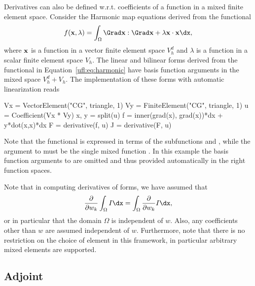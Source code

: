 Derivatives can also be defined w.r.t. coefficients of a function in a
mixed finite element space.  Consider the Harmonic map equations
derived from the functional
\begin{align} \label{ufl:eq:harmonic}
f(\xx, \lambda) = \int_\Omega \Grad \xx : \Grad \xx + \lambda \xx\cdot\xx \dx,
\end{align}
where $\mathbf{x}$ is a function in a vector finite element space $V_h^d$ and
$\lambda$ is a function in a scalar finite element space $V_h$.  The
linear and bilinear forms derived from the functional in
Equation~\ref{ufl:eq:harmonic} have basis function arguments in the
mixed space $V_h^d + V_h$.  The implementation of these forms with
automatic linearization reads
\begin{python}
Vx = VectorElement("CG", triangle, 1)
Vy = FiniteElement("CG", triangle, 1)
u = Coefficient(Vx * Vy)
x, y = split(u)
f = inner(grad(x), grad(x))*dx + y*dot(x,x)*dx
F = derivative(f, u)
J = derivative(F, u)
\end{python}
Note that the functional is expressed in terms of the subfunctions
 and , while the argument to  must
be the single mixed function .  In this example the basis
function arguments to  are omitted and thus provided
automatically in the right function spaces.

Note that in computing derivatives of forms, we have assumed that
\begin{align}
\frac{\partial}{\partial w_k} \int_\Omega I \dx
= \int_\Omega \frac{\partial}{\partial w_k} I \dx,
\end{align}
or in particular that the domain $\Omega$ is independent of $w$.
Also, any coefficients other than $w$ are assumed independent of $w$.
Furthermore, note that there is no restriction on the choice of
element in this framework, in particular arbitrary mixed elements are
supported.

\subsection{Adjoint}
\label{ufl:sec:adjoint}

